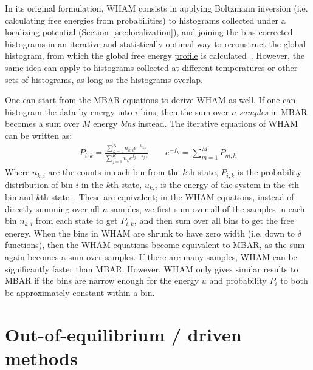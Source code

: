 \documentclass[9pt,review]{livecoms}
\begin{document}
In its original formulation, WHAM consists in applying Boltzmann inversion (i.e. calculating free energies from probabilities) to histograms collected under a localizing potential (Section~\ref{sec:localization}), and joining the bias-corrected histograms in an iterative and statistically optimal way to reconstruct the global histogram, from which the global free energy \hyperlink{ref:FES} {profile} is calculated~\cite{kumars:WHAM}.  However, the same idea can apply to histograms collected at different temperatures or other sets of histograms, as long as the histograms overlap.

One can start from the MBAR equations to derive WHAM as well. If one can histogram the data by energy into $i$ bins, then the sum over $n$ \textit{samples} in MBAR becomes a sum over $M$ energy \textit{bins} instead. The iterative equations of WHAM can be written as:
\begin{eqnarray}
P_{i,k} = \frac{\sum_{k=1}^K n_{k,i} e^{-u_{k,i}}}{\sum_{j=1}^{K}n_k {e^{f_j-u_{j,i}}}}\qquad
e^{-f_k} = \sum_{m=1}^M P_{m,k}
\end{eqnarray}
Where $n_{k,i}$ are the counts in each bin from the $k$th state, $P_{i,k}$ is the probability distribution of bin $i$ in the $k$th state,  $u_{k,i}$ is the energy of the system in the $i$th bin and $k$th state~\cite{kumars:WHAM}. These are equivalent; in the WHAM equations, instead of directly summing over all $n$ samples, we first sum over all of the samples in each bin $n_{k,i}$ from each state to get $P_{i,k}$, and then sum over all bins to get the free energy. When the bins in WHAM are shrunk to have zero width (i.e. down to $\delta$ functions), then the WHAM equations become equivalent to MBAR, as the sum again becomes a sum over samples. If there are many samples, WHAM can be significantly faster than MBAR. However, WHAM only gives similar results to MBAR if the bins are narrow enough for the energy $u$ and probability $P_i$ to both be approximately constant within a bin.

\section{Out-of-equilibrium / driven methods}
\label{sec:Out-of-equilibrium_driven}
\end{document}
